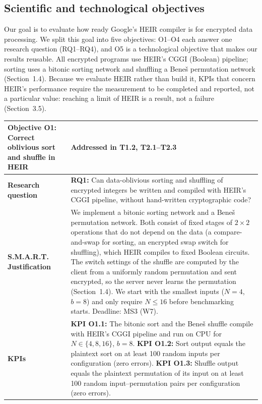 \subsection{Scientific and technological objectives}

Our goal is to evaluate how ready Google's HEIR compiler is for encrypted data processing. We split this goal into five objectives: O1--O4 each answer one research question (RQ1--RQ4), and O5 is a technological objective that makes our results reusable. All encrypted programs use HEIR's CGGI (Boolean) pipeline; sorting uses a bitonic sorting network and shuffling a Bene\v{s} permutation network (Section~1.4). Because we evaluate HEIR rather than build it, KPIs that concern HEIR's performance require the measurement to be completed and reported, not a particular value: reaching a limit of HEIR is a result, not a failure (Section~3.5).

\begin{table}[htbp]
\centering
\renewcommand{\arraystretch}{1.3}
\begin{tabularx}{\textwidth}{|p{}|L|}
\hline
\textbf{Objective O1: Correct oblivious sort and shuffle in HEIR} & \textbf{Addressed in T1.2, T2.1--T2.3} \\ \hline
\textbf{Research question} & \textbf{RQ1:} Can data-oblivious sorting and shuffling of encrypted integers be written and compiled with HEIR's CGGI pipeline, without hand-written cryptographic code? \\ \hline
\textbf{S.M.A.R.T. Justification} & We implement a bitonic sorting network and a Bene\v{s} permutation network. Both consist of fixed stages of $2 \times 2$ operations that do not depend on the data (a compare-and-swap for sorting, an encrypted swap switch for shuffling), which HEIR compiles to fixed Boolean circuits. The switch settings of the shuffle are computed by the client from a uniformly random permutation and sent encrypted, so the server never learns the permutation (Section~1.4). We start with the smallest inputs ($N=4$, $b=8$) and only require $N \le 16$ before benchmarking starts. Deadline: MS3 (W7). \\ \hline
\textbf{KPIs} & \textbf{KPI O1.1:} The bitonic sort and the Bene\v{s} shuffle compile with HEIR's CGGI pipeline and run on CPU for $N \in \{4, 8, 16\}$, $b = 8$. \newline \textbf{KPI O1.2:} Sort output equals the plaintext sort on at least 100 random inputs per configuration (zero errors). \newline \textbf{KPI O1.3:} Shuffle output equals the plaintext permutation of its input on at least 100 random input--permutation pairs per configuration (zero errors). \\ \hline
\end{tabularx}
\end{table}

